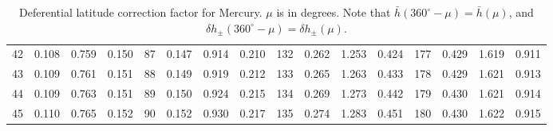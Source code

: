 \begin{table}[!h]
{\begin{tabular}{rrrr|rrrr|rrrr|crrr}
 42 & \tiny{  0.108} &   0.759 & \tiny{  0.150} &  87 & \tiny{  0.147} &   0.914 & \tiny{  0.210} & 132 & \tiny{  0.262} &   1.253 & \tiny{  0.424} & 177 & \tiny{  0.429} &   1.619 & \tiny{  0.911}\\
 43 & \tiny{  0.109} &   0.761 & \tiny{  0.151} &  88 & \tiny{  0.149} &   0.919 & \tiny{  0.212} & 133 & \tiny{  0.265} &   1.263 & \tiny{  0.433} & 178 & \tiny{  0.429} &   1.621 & \tiny{  0.913}\\
 44 & \tiny{  0.109} &   0.763 & \tiny{  0.151} &  89 & \tiny{  0.150} &   0.924 & \tiny{  0.215} & 134 & \tiny{  0.269} &   1.273 & \tiny{  0.442} & 179 & \tiny{  0.430} &   1.621 & \tiny{  0.914}\\
 45 & \tiny{  0.110} &   0.765 & \tiny{  0.152} &  90 & \tiny{  0.152} &   0.930 & \tiny{  0.217} & 135 & \tiny{  0.274} &   1.283 & \tiny{  0.451} & 180 & \tiny{  0.430} &   1.622 & \tiny{  0.915}\\
\end{tabular}}
\caption{Deferential latitude correction factor for Mercury. $\mu$ is in degrees. Note that $\bar{h}(360^\circ-\mu) = \bar{h}(\mu)$, and $\delta h_{\pm}(360^\circ-\mu) = \delta h_{\pm}(\mu)$. }\label{tlat2mc}
\end{table}


